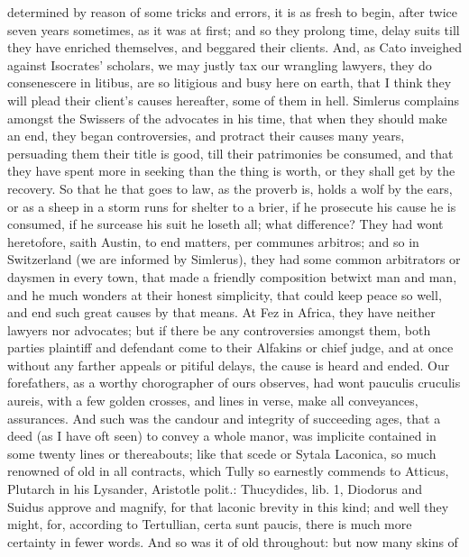 {determined by reason of some tricks and errors, it is as fresh to
begin, after twice seven years sometimes, as it was at first; and so
they prolong time, delay suits till they have enriched themselves, and
beggared their clients. And, as Cato inveighed against Isocrates'
scholars, we may justly tax our wrangling lawyers, they do consenescere
in litibus, are so litigious and busy here on earth, that I think they
will plead their client's causes hereafter, some of them in hell. 
Simlerus complains amongst the Swissers of the advocates in his time,
that when they should make an end, they began controversies, and
protract their causes many years, persuading them their title is good,
till their patrimonies be consumed, and that they have spent more in
seeking than the thing is worth, or they shall get by the recovery. So
that he that goes to law, as the proverb is, holds a wolf by the
ears, or as a sheep in a storm runs for shelter to a brier, if he
prosecute his cause he is consumed, if he surcease his suit he loseth
all; what difference? They had wont heretofore, saith Austin, to
end matters, per communes arbitros; and so in Switzerland (we are
informed by Simlerus), they had some common arbitrators or daysmen
in every town, that made a friendly composition betwixt man and man,
and he much wonders at their honest simplicity, that could keep peace
so well, and end such great causes by that means. At Fez in
Africa, they have neither lawyers nor advocates; but if there be any
controversies amongst them, both parties plaintiff and defendant come
to their Alfakins or chief judge, and at once without any farther
appeals or pitiful delays, the cause is heard and ended. Our
forefathers, as a worthy chorographer of ours observes, had wont
pauculis cruculis aureis, with a few golden crosses, and lines in
verse, make all conveyances, assurances. And such was the candour and
integrity of succeeding ages, that a deed (as I have oft seen) to
convey a whole manor, was implicite contained in some twenty lines or
thereabouts; like that scede or Sytala Laconica, so much renowned of
old in all contracts, which Tully so earnestly commends to
Atticus, Plutarch in his Lysander, Aristotle polit.: Thucydides, lib.
1, Diodorus and Suidus approve and magnify, for that laconic
brevity in this kind; and well they might, for, according to
Tertullian, certa sunt paucis, there is much more certainty in
fewer words. And so was it of old throughout: but now many skins of
}
